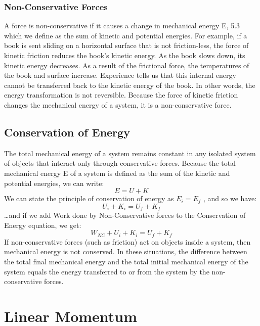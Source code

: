 \documentclass{article}
\begin{document}
		\subsubsection{Non-Conservative Forces}
        	A force is non-conservative if it causes a change in mechanical energy E, 5.3 which we define as the sum of kinetic and potential energies. For example, if a book is sent sliding on a horizontal surface that is not friction-less, the force of kinetic friction reduces the book’s kinetic energy. As the book slows down, its kinetic energy decreases. As a result of the frictional force, the temperatures of the book and surface increase. Experience tells us that this internal energy cannot be transferred back to the kinetic energy of the book. In other words, the energy transformation is not reversible. Because the force of kinetic friction changes the mechanical energy of a system, it is a non-conservative force.
	\subsection{Conservation of Energy}
    	The total mechanical energy of a system remains constant in any isolated system of objects that interact only through conservative forces. Because the total mechanical energy E of a system is defined as the sum of the kinetic and potential energies, we can write:
        \[
        	E=U+K
        \]
        We can state the principle of conservation of energy as $E_i=E_f$ , and so we have:
        \[
        	U_i+K_i=U_f+K_f
        \]
        \ldots and if we add Work done by Non-Conservative forces to the Conservation of Energy equation, we get:
        \[
        	W_{NC}+U_i+K_i=U_f+K_f
        \]
        If non-conservative forces (such as friction) act on objects inside a system, then mechanical energy is not conserved. In these situations, the difference between the total final mechanical energy and the total initial mechanical energy of the system equals the energy transferred to or from the system by the non-conservative forces.
        
\section{Linear Momentum}
\end{document}
